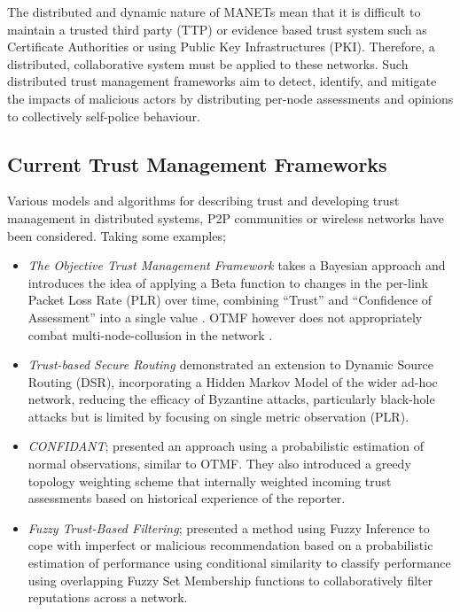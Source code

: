 The distributed and dynamic nature of MANETs mean that it is difficult to maintain a trusted third party (TTP) or evidence based trust system such as Certificate Authorities or using Public Key Infrastructures (PKI).
Therefore, a distributed, collaborative system must be applied to these networks.
Such distributed trust management frameworks aim to detect, identify, and mitigate the impacts of malicious actors by distributing per-node assessments and opinions to collectively self-police behaviour.

\subsection{Current Trust Management Frameworks}

Various models and algorithms for describing trust and developing trust management in distributed systems, P2P communities or wireless networks have been considered.
Taking some examples;

\begin{itemize}
  \item \emph{The Objective Trust Management Framework} takes a Bayesian approach and introduces the idea of applying a Beta function to changes in the per-link Packet Loss Rate (PLR) over time, combining ``Trust'' and ``Confidence of Assessment'' into a single value \cite{Li2008}.
    OTMF however does not appropriately combat multi-node-collusion in the network \cite{Cho2011}.
  \item \emph{Trust-based Secure Routing \cite{Moe2008a}} demonstrated an extension to Dynamic Source Routing (DSR), incorporating a Hidden Markov Model of the wider ad-hoc network, reducing the efficacy of Byzantine attacks, particularly black-hole attacks but is limited by focusing on single metric observation (PLR)\cite{Cho2011}.
  \item \emph{CONFIDANT}; \cite{Buchegger2002} presented an approach using a probabilistic estimation of normal observations, similar to OTMF. They also introduced a greedy topology weighting scheme that internally weighted incoming trust assessments based on historical experience of the reporter.
  \item \emph{Fuzzy Trust-Based Filtering}; \cite{Luo2008} presented a method using Fuzzy Inference to cope with imperfect or malicious recommendation based on a probabilistic estimation of performance using conditional similarity to classify performance using overlapping Fuzzy Set Membership functions to collaboratively filter reputations across a network.
\end{itemize}

